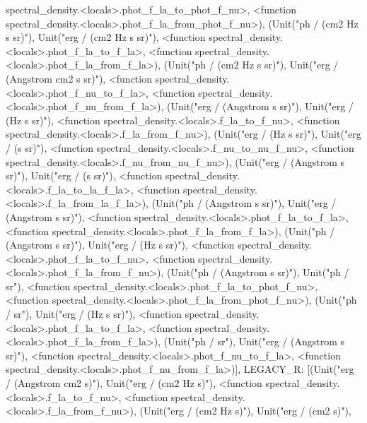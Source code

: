 \documentclass[letterpaper,10pt,english]{sphinxmanual}
\begin{document}
\begin{fulllineitems}
spectral\_density.\textless{}locals\textgreater{}.phot\_f\_la\_to\_phot\_f\_nu\textgreater{}, \textless{}function spectral\_density.\textless{}locals\textgreater{}.phot\_f\_la\_from\_phot\_f\_nu\textgreater{}), (Unit("ph / (cm2 Hz s sr)"), Unit("erg / (cm2 Hz s sr)"), \textless{}function spectral\_density.\textless{}locals\textgreater{}.phot\_f\_la\_to\_f\_la\textgreater{}, \textless{}function spectral\_density.\textless{}locals\textgreater{}.phot\_f\_la\_from\_f\_la\textgreater{}), (Unit("ph / (cm2 Hz s sr)"), Unit("erg / (Angstrom cm2 s sr)"), \textless{}function spectral\_density.\textless{}locals\textgreater{}.phot\_f\_nu\_to\_f\_la\textgreater{}, \textless{}function spectral\_density.\textless{}locals\textgreater{}.phot\_f\_nu\_from\_f\_la\textgreater{}), (Unit("erg / (Angstrom s sr)"), Unit("erg / (Hz s sr)"), \textless{}function spectral\_density.\textless{}locals\textgreater{}.f\_la\_to\_f\_nu\textgreater{}, \textless{}function spectral\_density.\textless{}locals\textgreater{}.f\_la\_from\_f\_nu\textgreater{}), (Unit("erg / (Hz s sr)"), Unit("erg / (s sr)"), \textless{}function spectral\_density.\textless{}locals\textgreater{}.f\_nu\_to\_nu\_f\_nu\textgreater{}, \textless{}function spectral\_density.\textless{}locals\textgreater{}.f\_nu\_from\_nu\_f\_nu\textgreater{}), (Unit("erg / (Angstrom s sr)"), Unit("erg / (s sr)"), \textless{}function spectral\_density.\textless{}locals\textgreater{}.f\_la\_to\_la\_f\_la\textgreater{}, \textless{}function spectral\_density.\textless{}locals\textgreater{}.f\_la\_from\_la\_f\_la\textgreater{}), (Unit("ph / (Angstrom s sr)"), Unit("erg / (Angstrom s sr)"), \textless{}function spectral\_density.\textless{}locals\textgreater{}.phot\_f\_la\_to\_f\_la\textgreater{}, \textless{}function spectral\_density.\textless{}locals\textgreater{}.phot\_f\_la\_from\_f\_la\textgreater{}), (Unit("ph / (Angstrom s sr)"), Unit("erg / (Hz s sr)"), \textless{}function spectral\_density.\textless{}locals\textgreater{}.phot\_f\_la\_to\_f\_nu\textgreater{}, \textless{}function spectral\_density.\textless{}locals\textgreater{}.phot\_f\_la\_from\_f\_nu\textgreater{}), (Unit("ph / (Angstrom s sr)"), Unit("ph / sr"), \textless{}function spectral\_density.\textless{}locals\textgreater{}.phot\_f\_la\_to\_phot\_f\_nu\textgreater{}, \textless{}function spectral\_density.\textless{}locals\textgreater{}.phot\_f\_la\_from\_phot\_f\_nu\textgreater{}), (Unit("ph / sr"), Unit("erg / (Hz s sr)"), \textless{}function spectral\_density.\textless{}locals\textgreater{}.phot\_f\_la\_to\_f\_la\textgreater{}, \textless{}function spectral\_density.\textless{}locals\textgreater{}.phot\_f\_la\_from\_f\_la\textgreater{}), (Unit("ph / sr"), Unit("erg / (Angstrom s sr)"), \textless{}function spectral\_density.\textless{}locals\textgreater{}.phot\_f\_nu\_to\_f\_la\textgreater{}, \textless{}function spectral\_density.\textless{}locals\textgreater{}.phot\_f\_nu\_from\_f\_la\textgreater{}){]}, \textquotesingle{}LEGACY\_R\textquotesingle{}: {[}(Unit("erg / (Angstrom cm2 s)"), Unit("erg / (cm2 Hz s)"), \textless{}function spectral\_density.\textless{}locals\textgreater{}.f\_la\_to\_f\_nu\textgreater{}, \textless{}function spectral\_density.\textless{}locals\textgreater{}.f\_la\_from\_f\_nu\textgreater{}), (Unit("erg / (cm2 Hz s)"), Unit("erg / (cm2 s)"), 
\end{fulllineitems}
\end{document}
